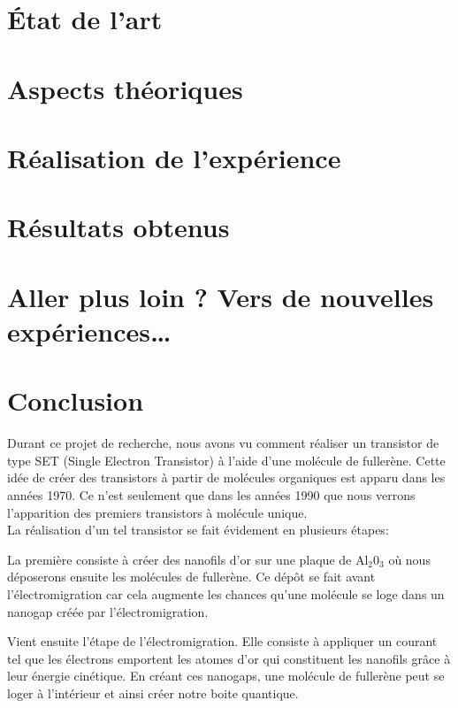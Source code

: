 \documentclass[a4paper,11pt]{report}
\begin{document}
\chapter{État de l'art}

\chapter{Aspects théoriques}


\chapter{Réalisation de l'expérience}

    
\chapter{Résultats obtenus}


\chapter{Aller plus loin ? Vers de nouvelles expériences…}


\chapter*{Conclusion}
Durant ce projet de recherche, nous avons vu comment réaliser un transistor de type SET (Single Electron Transistor) à l'aide d'une molécule de fullerène. Cette idée de créer des transistors à partir de molécules organiques est apparu dans les années 1970. Ce n'est seulement que dans les années 1990 que nous verrons l'apparition des premiers transistors à molécule unique.\\

La réalisation d'un tel transistor se fait évidement en plusieurs étapes:

La première consiste à créer des nanofils d'or sur une plaque de Al$_2$0$_3$ où nous déposerons ensuite les molécules de fullerène. Ce dépôt se fait avant l'électromigration car cela augmente les chances qu'une molécule se loge dans un nanogap créée par l'électromigration.

Vient ensuite l'étape de l'électromigration. Elle consiste à appliquer un courant tel que les électrons emportent les atomes d'or qui constituent les nanofils grâce à leur énergie cinétique. En créant ces nanogaps, une molécule de fullerène peut se loger à l'intérieur et ainsi créer notre boite quantique. 
\end{document}
